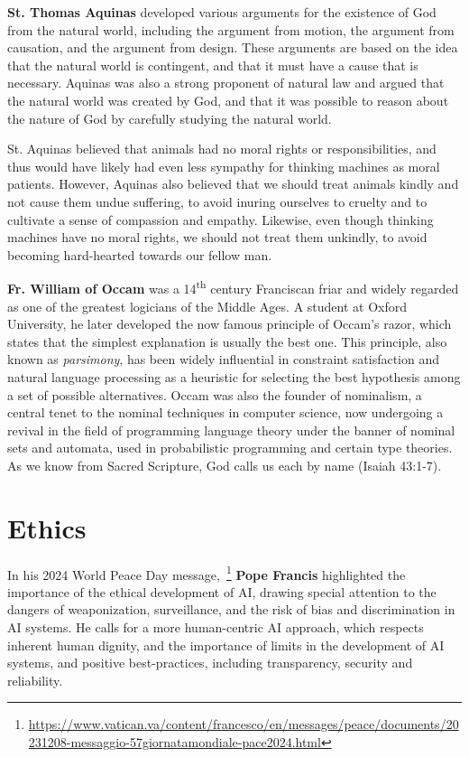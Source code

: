 \documentclass[sigplan,nonacm]{acmart}\settopmatter{printfolios=false,printccs=false,printacmref=false}
\begin{document}
  \textbf{St. Thomas Aquinas} developed various arguments for the existence of God from the natural world, including the argument from motion, the argument from causation, and the argument from design. These arguments are based on the idea that the natural world is contingent, and that it must have a cause that is necessary. Aquinas was also a strong proponent of natural law and argued that the natural world was created by God, and that it was possible to reason about the nature of God by carefully studying the natural world.

  St. Aquinas believed that animals had no moral rights or responsibilities, and thus would have likely had even less sympathy for thinking machines as moral patients. However, Aquinas also believed that we should treat animals kindly and not cause them undue suffering, to avoid inuring ourselves to cruelty and to cultivate a sense of compassion and empathy. Likewise, even though thinking machines have no moral rights, we should not treat them unkindly, to avoid becoming hard-hearted towards our fellow man.

  \textbf{Fr. William of Occam} was a 14\textsuperscript{th} century Franciscan friar and widely regarded as one of the greatest logicians of the Middle Ages. A student at Oxford University, he later developed the now famous principle of Occam's razor, which states that the simplest explanation is usually the best one. This principle, also known as \textit{parsimony}, has been widely influential in constraint satisfaction and natural language processing as a heuristic for selecting the best hypothesis among a set of possible alternatives. Occam was also the founder of nominalism, a central tenet to the nominal techniques in computer science, now undergoing a revival in the field of programming language theory under the banner of nominal sets and automata, used in probabilistic programming and certain type theories. As we know from Sacred Scripture, God calls us each by name (Isaiah 43:1-7).

  \section{Ethics}

  In his 2024 World Peace Day message,~\footnote{\url{https://www.vatican.va/content/francesco/en/messages/peace/documents/20231208-messaggio-57giornatamondiale-pace2024.html}} \textbf{Pope Francis} highlighted the importance of the ethical development of AI, drawing special attention to the dangers of weaponization, surveillance, and the risk of bias and discrimination in AI systems. He calls for a more human-centric AI approach, which respects inherent human dignity, and the importance of limits in the development of AI systems, and positive best-practices, including transparency, security and reliability.
\end{document}
